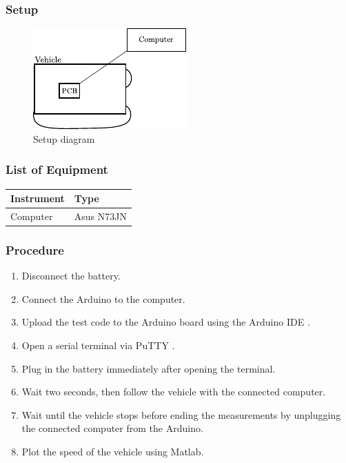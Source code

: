 \subsubsection{Setup}
\begin{figure}[H]
	\centering
	\includegraphics[scale=1.6]{figures/inertiaTestSetupDiagram2.pdf}
	\caption{Setup diagram}
	\label{inertiaTestSetupDiagram}
\end{figure}

\subsubsection{List of Equipment}

\begin{table}[H]
\begin{tabular}{|p{10cm}|p{4cm}|}
\hline%
  \textbf{Instrument}                     &  \textbf{Type}       \\
\hline%
  Computer                                &  Asus N73JN    \\
\hline %
\end{tabular}
\end{table}

\subsubsection{Procedure}

\begin{enumerate}
  \item Disconnect the battery.
  \item Connect the Arduino to the computer.
  \item Upload the test code to the Arduino board using the Arduino IDE  \cite{ArduinoIDE}.
  \item Open a serial terminal via PuTTY \cite{PuTTY}.
  \item Plug in the battery immediately after opening the terminal.
  \item Wait two seconds, then follow the vehicle with the connected computer.
  \item Wait until the vehicle stops before ending the measurements by unplugging the connected computer from the Arduino.
  \item Plot the speed of the vehicle using Matlab.
\end{enumerate}

